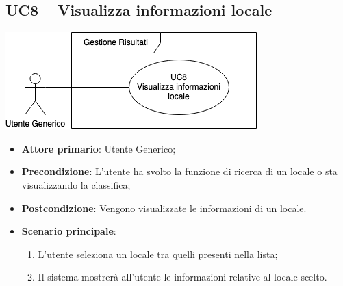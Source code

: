 \subsection{UC8 – Visualizza informazioni locale}
\begin{center}
\includegraphics[scale=0.5]{UC_images/UC8.png} 
\end{center}
\begin{itemize}
    \item \textbf{Attore primario}: Utente Generico;
    \item \textbf{Precondizione}: L'utente ha svolto la funzione di ricerca di un locale o sta visualizzando la classifica;
    \item \textbf{Postcondizione}: Vengono visualizzate le informazioni di un locale.
    
    \item \textbf{Scenario principale}: 
    \begin{enumerate}
    \item L'utente seleziona un locale tra quelli presenti nella lista;
    \item Il sistema mostrerà all'utente le informazioni relative al locale scelto.
    \end{enumerate}
\end{itemize}

